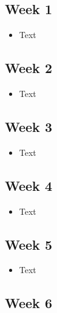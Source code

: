 \documentclass[10pt, onecolumn, draftclsnofoot, letterpaper, compsoc]{IEEEtran}
\begin{document}
\subsection{Week 1}

\begin{itemize}

\item Text

\end{itemize}

\subsection{Week 2}

\begin{itemize}

\item Text

\end{itemize}

\subsection{Week 3}

\begin{itemize}

\item Text

\end{itemize}

\subsection{Week 4}

\begin{itemize}

\item Text

\end{itemize}

\subsection{Week 5}

\begin{itemize}

\item Text

\end{itemize}

\subsection{Week 6}
\end{document}
